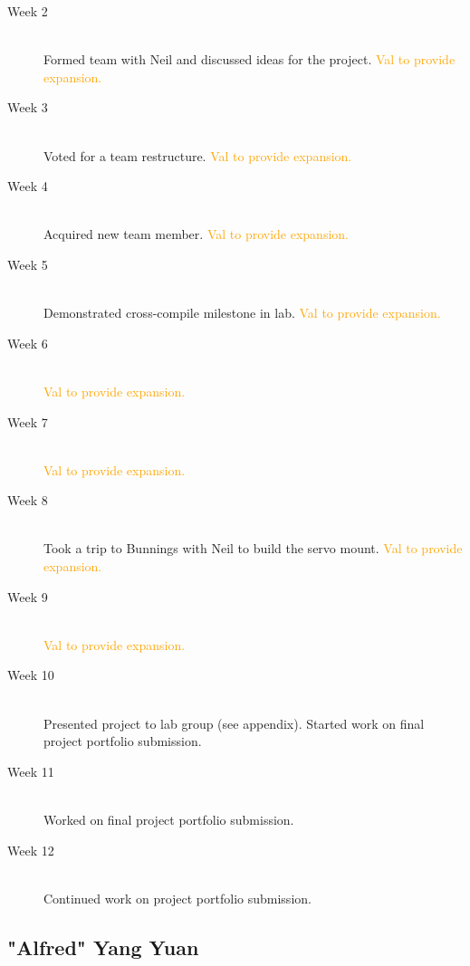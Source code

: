 \documentclass[11pt,a4paper,titlepage]{report}
\begin{document}
\begin{description}

  \item[Week 2] \hfill \\
      Formed team with Neil and discussed ideas for the project. \textcolor{orange}{Val to provide expansion.}
  \item[Week 3] \hfill \\
      Voted for a team restructure. \textcolor{orange}{Val to provide expansion.}
  \item[Week 4] \hfill \\
      Acquired new team member. \textcolor{orange}{Val to provide expansion.}
  \item[Week 5] \hfill \\
      Demonstrated cross-compile milestone in lab. \textcolor{orange}{Val to provide expansion.}
  \item[Week 6] \hfill \\
      \textcolor{orange}{Val to provide expansion.}
  \item[Week 7] \hfill \\
       \textcolor{orange}{Val to provide expansion.}
  \item[Week 8] \hfill \\
      Took a trip to Bunnings with Neil to build the servo mount. \textcolor{orange}{Val to provide expansion.}
  \item[Week 9] \hfill \\
       \textcolor{orange}{Val to provide expansion.}
  \item[Week 10] \hfill \\
      Presented project to lab group (see appendix). Started work on final project portfolio submission.
  \item[Week 11] \hfill \\
      Worked on final project portfolio submission.
  \item[Week 12] \hfill \\
      Continued work on project portfolio submission.

\end{description}


\subsection{"Alfred" Yang Yuan}
\end{document}
